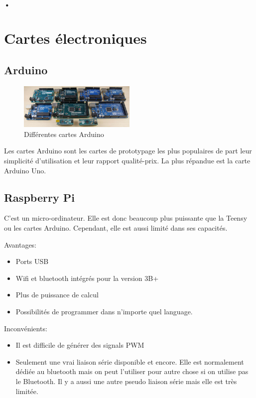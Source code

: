 \documentclass[a4paper, 11pt]{report}
\begin{document}
\subsubsection{•}

\chapter{Cartes électroniques}

\section{Arduino}

\begin{figure}[h]
\begin{centering}
\includegraphics[width=0.5\textwidth]{images/cartesArduino.jpg}
\caption{Différentes cartes Arduino}
\par\end{centering}
\end{figure}

Les cartes Arduino sont les cartes de prototypage les plus populaires de part leur simplicité d'utilisation et leur rapport qualité-prix. La plus répandue est la carte Arduino Uno.

\section{Raspberry Pi}
C'est un micro-ordinateur. Elle est donc beaucoup plus puissante que la Teensy ou les cartes Arduino. Cependant, elle est aussi limité dans ses capacités.

Avantages:
\begin{itemize}
\item Ports USB
\item Wifi et bluetooth intégrés pour la version 3B+
\item Plus de puissance de calcul
\item Possibilités de programmer dans n'importe quel language.
\end{itemize}

Inconvénients:
\begin{itemize}
\item Il est difficile de générer des signals PWM
\item Seulement une vrai liaison série disponible et encore. Elle est normalement dédiée au bluetooth mais on peut l'utiliser pour autre chose si on utilise pas le Bluetooth. Il y a aussi une autre pseudo liaison série mais elle est très limitée.
\end{itemize}
\end{document}
